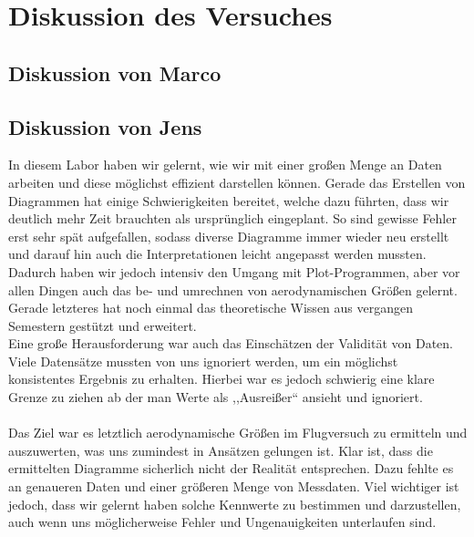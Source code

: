 \chapter{Diskussion des Versuches}
\label{chapter:fazit}
\section{Diskussion von Marco}
\newpage

\section{Diskussion von Jens}
In diesem Labor haben wir gelernt, wie wir mit einer großen Menge an Daten arbeiten und diese möglichst effizient darstellen können. Gerade das Erstellen von Diagrammen hat einige Schwierigkeiten bereitet, welche dazu führten, dass wir deutlich mehr Zeit brauchten als ursprünglich eingeplant. So sind gewisse Fehler erst sehr spät aufgefallen, sodass diverse Diagramme immer wieder neu erstellt und darauf hin auch die Interpretationen leicht angepasst werden mussten. Dadurch haben wir jedoch intensiv den Umgang mit Plot-Programmen, aber vor allen Dingen auch das be- und umrechnen von aerodynamischen Größen gelernt. Gerade letzteres hat noch einmal das theoretische Wissen aus vergangen Semestern gestützt und erweitert.\\
Eine große Herausforderung war auch das Einschätzen der Validität von Daten. Viele Datensätze mussten von uns ignoriert werden, um ein möglichst konsistentes Ergebnis zu erhalten. Hierbei war es jedoch schwierig eine klare Grenze zu ziehen ab der man Werte als ,,Ausreißer`` ansieht und ignoriert.\\\\
Das Ziel war es letztlich aerodynamische Größen im Flugversuch zu ermitteln und auszuwerten, was uns zumindest in Ansätzen gelungen ist. Klar ist, dass die ermittelten Diagramme sicherlich nicht der Realität entsprechen. Dazu fehlte es an genaueren Daten und einer größeren Menge von Messdaten. Viel wichtiger ist jedoch, dass wir gelernt haben solche Kennwerte zu bestimmen und darzustellen, auch wenn uns möglicherweise Fehler und Ungenauigkeiten unterlaufen sind.

